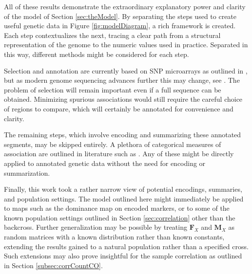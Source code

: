 \documentclass[sts]{imsart}
\newcommand{\m}[1]{\mathbf{#1}}               %
\begin{document}
All of these results demonstrate the extraordinary explanatory power and clarity of the model of Section \ref{sec:theModel}. By separating the steps used to create useful genetic data in Figure \ref{fig:modelDiagram}, a rich framework is created. Each step contextualizes the next, tracing a clear path from a structural representation of the genome to the numeric values used in practice. Separated in this way, different methods might be considered for each step.

Selection and annotation are currently based on SNP microarrays as outlined in \cite{laframboise2009}, but as modern genome sequencing advances further this may change, see \cite{heatherchain2016sequencers, hasinetal2017multi, uffelmannetal2021gwas}. The problem of selection will remain important even if a full sequence can be obtained. Minimizing spurious associations would still require the careful choice of regions to compare, which will certainly be annotated for convenience and clarity.

The remaining steps, which involve encoding and summarizing these annotated segments, may be skipped entirely. A plethora of categorical measures of association are outlined in literature such as \cite{goodmankruskal1979measures}. Any of these might be directly applied to annotated genetic data without the need for encoding or summarization.

Finally, this work took a rather narrow view of potential encodings, summaries, and population settings. The model outlined here might immediately be applied to maps such as the dominance map on encoded markers, or to some of the known population settings outlined in Section \ref{sec:correlation} other than the backcross. Further generalization may be possible by treating $\m{F}_X$ and $\m{M}_X$ as random matrices with a known distribution rather than known constants, extending the results gained to a natural population rather than a specified cross. Such extensions may also prove insightful for the sample correlation as outlined in Section \ref{subsec:corrCountCO}.
\end{document}
